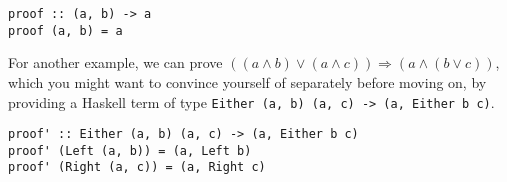 \documentclass[12pt,twoside]{report}
\begin{document}
\begin{lstlisting}
proof :: (a, b) -> a
proof (a, b) = a
\end{lstlisting}

For another example, we can prove $((a \wedge b) \vee (a \wedge c)) \Rightarrow (a \wedge (b \vee c))$, which you might want to convince yourself of separately before moving on, by providing a Haskell term of type \verb|Either (a, b) (a, c) -> (a, Either b c)|.

\begin{lstlisting}
proof' :: Either (a, b) (a, c) -> (a, Either b c)
proof' (Left (a, b)) = (a, Left b)
proof' (Right (a, c)) = (a, Right c)
\end{lstlisting}

\end{document}
